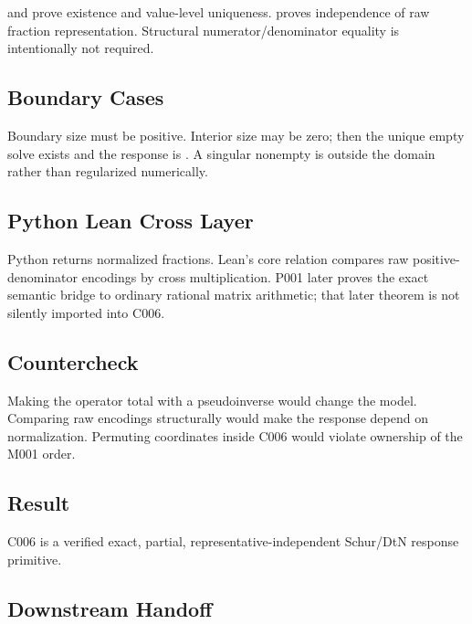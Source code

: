\texttt{\protect{}} and
\texttt{\protect{}} prove existence and
value-level uniqueness. \texttt{\protect{}} proves
independence of raw fraction representation. Structural
numerator/denominator equality is intentionally not required.

\subsection{Boundary Cases}\label{boundary-cases-7}

Boundary size must be positive. Interior size may be zero; then the
unique empty solve exists and the response is \texttt{\protect{}}. A singular
nonempty \texttt{\protect{}} is outside the domain rather than regularized
numerically.

\subsection{Python Lean Cross Layer}\label{python-lean-cross-layer-7}

Python returns normalized fractions. Lean's core relation compares raw
positive-denominator encodings by cross multiplication. P001 later
proves the exact semantic bridge to ordinary rational matrix arithmetic;
that later theorem is not silently imported into C006.

\subsection{Countercheck}\label{countercheck-7}

Making the operator total with a pseudoinverse would change the model.
Comparing raw encodings structurally would make the response depend on
normalization. Permuting coordinates inside C006 would violate ownership
of the M001 order.

\subsection{Result}\label{result-16}

C006 is a verified exact, partial, representative-independent Schur/DtN
response primitive.

\subsection{Downstream Handoff}\label{downstream-handoff-16}

